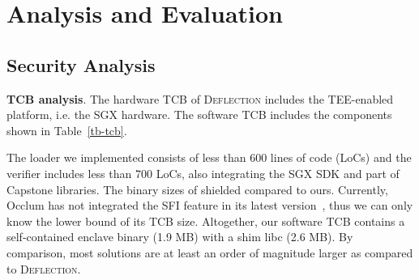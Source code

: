 \section{Analysis and Evaluation}\label{sec-evaluation}

\subsection{Security Analysis}\label{subsec-securityanalysis}

\noindent\textbf{TCB analysis}. 
The hardware TCB of \textsc{Deflection} includes the TEE-enabled platform, i.e. the SGX hardware. The software TCB includes the components shown in Table~\ref{tb-tcb}. \DIFaddbegin {}

\DIFaddend The loader we implemented consists of less than 600 lines of code (LoCs) and the verifier includes less than 700 LoCs, also integrating the SGX SDK and part of Capstone libraries. 
The \DIFdelbegin {}\DIFdelend binary sizes of shielded \DIFdelbegin {}\DIFdelend \DIFaddbegin {}\DIFaddend compared to ours. Currently, Occlum has not integrated the SFI feature in its latest version~\cite{occlum}, thus we can only know the lower bound of its TCB size.
Altogether, our software TCB contains a self-contained enclave binary (1.9 MB) with a shim libc (2.6 MB). By comparison, most solutions are at least an order of magnitude larger as compared to \textsc{Deflection}.


